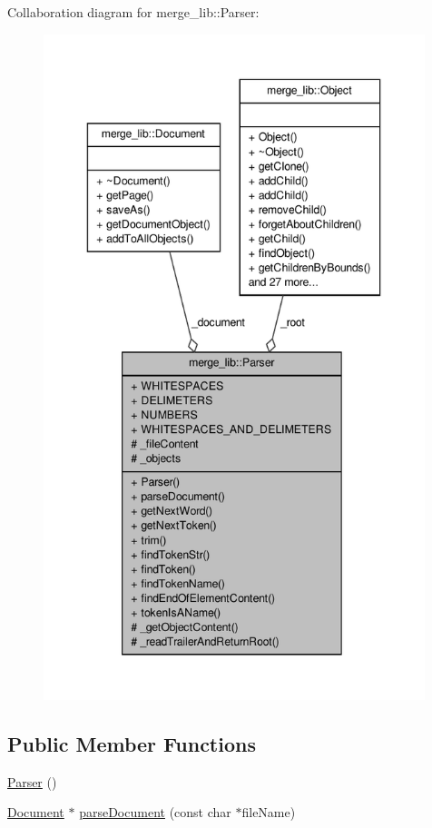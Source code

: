 Collaboration diagram for merge\-\_\-lib\-:\-:Parser\-:
\nopagebreak
\begin{figure}[H]
\begin{center}
\leavevmode
\includegraphics[height=550pt]{df/d9b/classmerge__lib_1_1_parser__coll__graph}
\end{center}
\end{figure}
\subsection*{Public Member Functions}
\begin{DoxyCompactItemize}
\item 
\hyperlink{classmerge__lib_1_1_parser_a0c16db1ac6d8d9c78fbcf5168fee3db7}{Parser} ()
\item 
\hyperlink{classmerge__lib_1_1_document}{Document} $\ast$ \hyperlink{classmerge__lib_1_1_parser_a5658f9ef56e67d81e135db5b36d2881a}{parse\-Document} (const char $\ast$file\-Name)
\end{DoxyCompactItemize}
